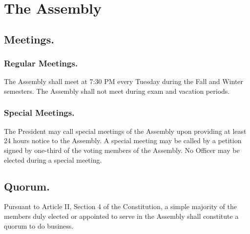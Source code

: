 
\section{The Assembly}

\subsection{Meetings.}

\subsubsection{Regular Meetings.}
The Assembly shall meet at 7:30 PM every Tuesday during the Fall and Winter semesters. The Assembly shall not meet during exam and vacation periods.
\subsubsection{Special Meetings.}
The President may call special meetings of the Assembly upon providing at least 24 hours notice to the Assembly. A special meeting may be called by a petition signed by one-third of the voting members of the Assembly. No Officer may be elected during a special meeting.

\subsection{Quorum.}
Pursuant to Article II, Section 4 of the Constitution, a simple majority of the members duly elected or appointed to serve in the Assembly shall constitute a quorum to do business.